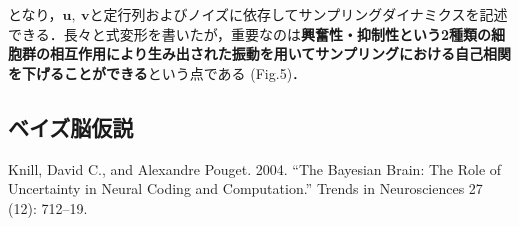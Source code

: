 となり，$\mathbf{u}\mathbf{,\ v}$と定行列およびノイズに依存してサンプリングダイナミクスを記述できる．長々と式変形を書いたが，重要なのは\textbf{興奮性・抑制性という2種類の細胞群の相互作用により生み出された振動を用いてサンプリングにおける自己相関を下げることができる}という点である (Fig.5)．
\subsection{ベイズ脳仮説}
Knill, David C., and Alexandre Pouget. 2004. “The Bayesian Brain: The Role of Uncertainty in Neural Coding and Computation.” Trends in Neurosciences 27 (12): 712–19.
